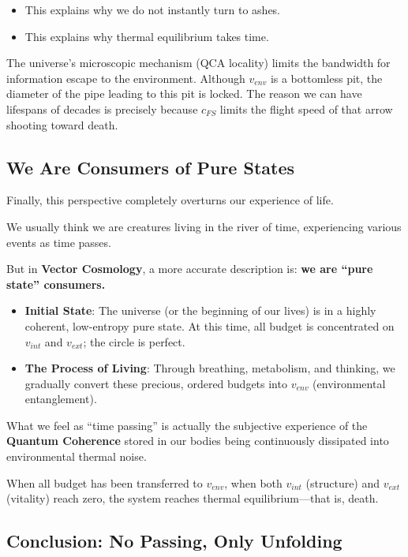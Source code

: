 \begin{itemize}
\item This explains why we do not instantly turn to ashes.

\item This explains why thermal equilibrium takes time.
\end{itemize}

The universe's microscopic mechanism (QCA locality) limits the bandwidth for information escape to the environment. Although $v_{env}$ is a bottomless pit, the diameter of the pipe leading to this pit is locked. The reason we can have lifespans of decades is precisely because $c_{FS}$ limits the flight speed of that arrow shooting toward death.

\subsection{We Are Consumers of Pure States}

Finally, this perspective completely overturns our experience of life.

We usually think we are creatures living in the river of time, experiencing various events as time passes.

But in \textbf{Vector Cosmology}, a more accurate description is: \textbf{we are ``pure state'' consumers.}

\begin{itemize}
\item \textbf{Initial State}: The universe (or the beginning of our lives) is in a highly coherent, low-entropy pure state. At this time, all budget is concentrated on $v_{int}$ and $v_{ext}$; the circle is perfect.

\item \textbf{The Process of Living}: Through breathing, metabolism, and thinking, we gradually convert these precious, ordered budgets into $v_{env}$ (environmental entanglement).
\end{itemize}

What we feel as ``time passing'' is actually the subjective experience of the \textbf{Quantum Coherence} stored in our bodies being continuously dissipated into environmental thermal noise.

When all budget has been transferred to $v_{env}$, when both $v_{int}$ (structure) and $v_{ext}$ (vitality) reach zero, the system reaches thermal equilibrium---that is, death.

\subsection{Conclusion: No Passing, Only Unfolding}

